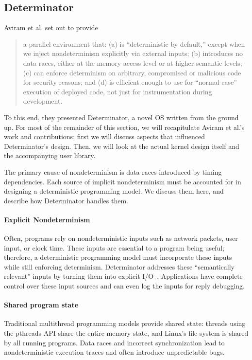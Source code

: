 \subsection{Determinator}

Aviram et al. set out to provide
\begin{quote}
a parallel environment that:
(a) is ``deterministic by default,'' except when
we inject nondeterminism explicitly via external inputs;
(b) introduces no data races, either at the memory access level
or at higher semantic levels; (c)
can enforce determinism on arbitrary, compromised or
malicious code for security reasons; and (d) is efﬁcient
enough to use for ``normal-case'' execution of deployed
code, not just for instrumentation during development. \cite{Aviram10}
\end{quote}

To this end, they presented Determinator, a novel OS written from the ground up.
For most of the remainder of this section, we will recapitulate Aviram et al.'s
work and contributions; first we will discuss aspects that influenced
Determinator's design. Then, we will look at the actual kernel design itself
and the accompanying user library.

The primary cause of nondeterminism is data races introduced by timing
dependencies. Each source of implicit nondeterminism must be accounted for in
designing a deterministic programming model. We discuss them here, and describe
how Determinator handles them.

\paragraph{Explicit Nondeterminism}
Often, programs rely on nondeterministic inputs such as network packets, user
input, or clock time. These inputs are essential to a program being useful;
therefore, a deterministic programming model must incorporate these inputs while
still enforcing determinism. Determinator addresses these ``semantically
relevant'' inputs by turning them into explicit I/O~\cite{Aviram10}.
Applications have complete control over these input sources and can even log the
inputs for reply debugging.

\paragraph{Shared program state}
Traditional multithread programming models provide shared state: threads using
the pthreads API share the entire memory state, and Linux's file system is
shared by all running programs. Data races and incorrect synchronization lead
to nondeterministic execution traces and often introduce unpredictable bugs.

